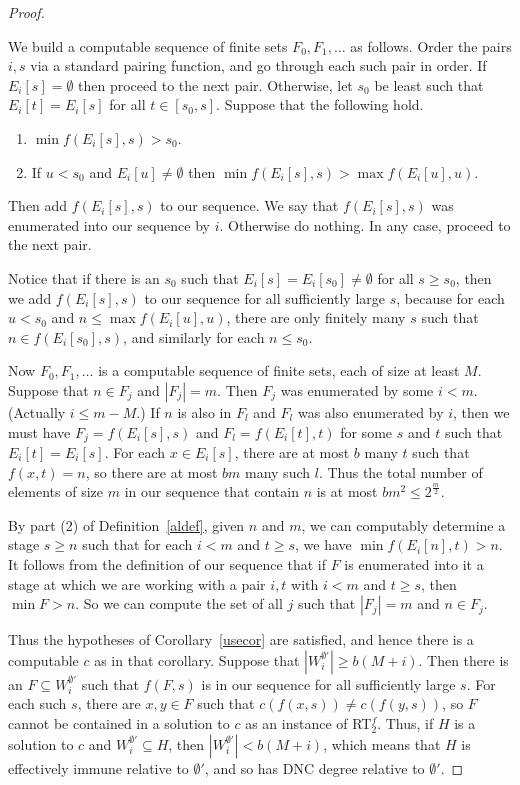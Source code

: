 \documentclass{amsart}
\theoremstyle{definition}
\renewcommand{\leq}{\leqslant}
\renewcommand{\geq}{\geqslant}
\begin{document}
\begin{proof}
\begin{enumerate}
\end{enumerate}

We build a computable sequence of finite sets $F_0,F_1,\ldots$ as
follows. Order the pairs $i,s$ via a standard pairing function, and go
through each such pair in order. If $E_i[s] = \emptyset$ then proceed
to the next pair. Otherwise, let $s_0$ be least such that
$E_i[t]=E_i[s]$ for all $t \in [s_0,s]$. Suppose that the following
hold.
\begin{enumerate}

\item $\min f(E_i[s],s)>s_0$.

\item If $u<s_0$ and $E_i[u] \neq \emptyset$ then $\min f(E_i[s],s) >
\max f(E_i[u],u)$. 

\end{enumerate}
Then add $f(E_i[s],s)$ to our sequence. We say that $f(E_i[s],s)$ was
enumerated into our sequence by $i$. Otherwise do nothing. In
any case, proceed to the next pair.

Notice that if there is an $s_0$ such that $E_i[s]=E_i[s_0] \neq
\emptyset$ for all $s \geq s_0$, then we add $f(E_i[s],s)$ to our
sequence for all sufficiently large $s$, because for each $u<s_0$ and
$n \leq \max f(E_i[u],u)$, there are only finitely many $s$ such that
$n \in f(E_i[s_0],s)$, and similarly for each $n \leq s_0$.

Now $F_0,F_1,\ldots$ is a computable sequence of finite sets, each of
size at least $M$. Suppose that $n \in F_j$ and $|F_j|=m$. Then $F_j$
was enumerated by some $i < m$. (Actually $i \leq m-M$.) If $n$ is
also in $F_l$ and $F_l$ was also enumerated by $i$, then we must have
$F_j=f(E_i[s],s)$ and $F_l=f(E_i[t],t)$ for some $s$ and $t$ such that
$E_i[t]=E_i[s]$. For each $x \in E_i[s]$, there are at most $b$ many
$t$ such that $f(x,t)=n$, so there are at most $bm$ many such
$l$. Thus the total number of elements of size $m$ in our sequence
that contain $n$ is at most $bm^2 \leq 2^{\frac{m}{2}}$.

By part (2) of Definition~\ref{aldef}, given $n$ and $m$, we can
computably determine a stage $s \geq n$ such that for each $i<m$ and
$t \geq s$, we have $\min f(E_i[n],t)>n$. It follows from the
definition of our sequence that if $F$ is enumerated into it a stage
at which we are working with a pair $i,t$ with $i<m$ and $t \geq s$,
then $\min F > n$. So we can compute the set of all $j$ such that
$|F_j|=m$ and $n \in F_j$.

Thus the hypotheses of Corollary~\ref{usecor} are satisfied, and hence
there is a computable $c$ as in that corollary. Suppose that
$|W^{\emptyset'}_i| \geq b(M+i)$. Then there is an $F \subseteq
W^{\emptyset'}_i$ such that $f(F,s)$ is in our sequence for all
sufficiently large $s$. For each such $s$, there are $x,y \in F$ such
that $c(f(x,s)) \neq c(f(y,s))$, so $F$ cannot be contained in a
solution to $c$ as an instance of RT$^f_2$. Thus, if $H$ is a solution
to $c$ and $W^{\emptyset'}_i \subseteq H$, then $|W^{\emptyset'}_i| <
b(M+i)$, which means that $H$ is effectively immune relative to
$\emptyset'$, and so has DNC degree relative to $\emptyset'$.
\end{proof}
\end{document}
